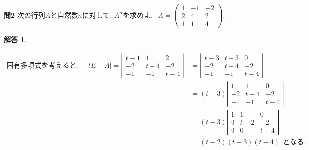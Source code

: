 \documentclass{jsarticle}
\newtheorem*{answer*}{解答}
\begin{document}
\bigskip
\bigskip

\begin{itembox}[l]{\textbf{問2}}
次の行列$A$と自然数$n$に対して, $A^n$を求めよ. \ 
$A=\left(\begin{array}{ccc}
1 & -1 & -2 \\
2 & 4 & 2 \\
1 & 1 & 4
\end{array}\right)$.
\end{itembox}

\begin{answer*}
\end{answer*}
\begin{align*}
固有多項式を考えると, \quad|t E-A|=\left|\begin{array}{ccc}
t-1 & 1 & 2 \\
-2 & t-4 & -2 \\
-1 & -1 & t-4
\end{array}\right| 
& =\left|\begin{array}{ccc}
t-3 & t-3 & 0 \\
-2 & t-4 & -2 \\
-1 & -1 & t-4
\end{array}\right| \\
& =(t-3) \left|\begin{array}{ccc}
1 & 1 & 0 \\
-2 & t-4 & -2 \\
-1 & -1 & t-4
\end{array}\right| \\
 & =(t-3) \left|\begin{array}{ccc}
1 & 1 & 0 \\
0 & t-2 & -2 \\
0 & 0 & t-4
\end{array}\right| \\
 \quad & = (t-2)(t-3)(t-4) \ \ となる.
\end{align*}
\end{document}
